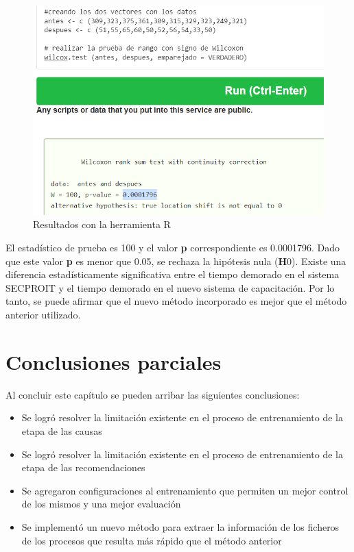 \begin{figure}[H]
\centering
\includegraphics[width=0.9\linewidth]{imagen/erre.png}
 \caption{Resultados con la herramienta R}
 \label{fig:herrR} 
\end{figure}

El estadístico de prueba es 100 y el valor \textbf{p} correspondiente es 0.0001796. Dado que este valor \textbf{p} es menor que 0.05, se rechaza la hipótesis nula (\textbf{H}0). Existe una diferencia estadísticamente significativa entre el tiempo demorado en el sistema SECPROIT y el tiempo demorado en el nuevo sistema de capacitación. Por lo tanto, se puede afirmar que el nuevo método incorporado es mejor que el método anterior utilizado.

\section{Conclusiones parciales}
Al concluir este capítulo se pueden arribar las siguientes conclusiones:
\begin{itemize}
\item Se logró resolver la limitación existente en el proceso de entrenamiento de la etapa de las causas
\item Se logró resolver la limitación existente en el proceso de entrenamiento de la etapa de las recomendaciones
\item Se agregaron configuraciones al entrenamiento que permiten un mejor control de los mismos y una mejor evaluación
\item Se implementó un nuevo método para extraer la información de los ficheros de los procesos que resulta más rápido que el método anterior
\end{itemize}